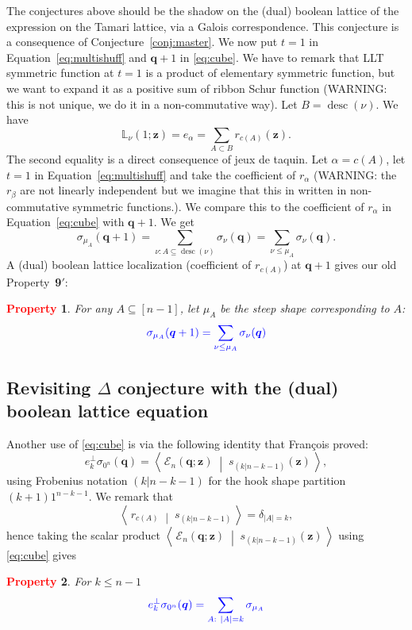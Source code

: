 \documentclass[12pt]{amsart}
\newcommand{\blue}[1]{\textcolor{blue}{#1}}
\newcommand{\red}[1]{\textcolor{red}{#1}}
\newcommand{\green}[1]{\textcolor{green!75!black}{#1}}
\theoremstyle{plain}
\newtheorem{property}{\red{Property}}
\theoremstyle{definition}
\theoremstyle{remark}
\newcommand{\Qvar}{{\bm q}}
\newcommand{\Zvar}{{\bm z}}
\newcommand{\desc}{\mathop{\mathrm{desc}}}
\newcommand{\dotprod}[2]{\left\langle \, #1 \; \middle| \; #2 \, \right\rangle} %
\begin{document}
The conjectures above should be the shadow on the (dual) boolean lattice of the expression on the Tamari lattice, via a Galois correspondence.
This conjecture is a consequence of Conjecture~\ref{conj:master}. We  now put $t=1$ in Equation~\eqref{eq:multishuff}  and $\Qvar+1$ in \eqref{eq:cube}.
We have to remark that LLT symmetric function at $t=1$ is a product of elementary symmetric function, but we want to expand it as a positive sum of ribbon 
Schur function (\green{WARNING: this is not unique, we do it in a non-commutative way}). Let $B = \desc(\nu)$. We have
\[
{\mathbb L}_\nu(1;\Zvar)= e_{\alpha}=\sum_{A\subset B} r_{c(A)}(\Zvar).
\]
The second equality is a direct consequence of jeux de taquin. Let $\alpha=c(A)$, let $t=1$ in Equation~\eqref{eq:multishuff} and take the coefficient of $r_\alpha$
(\green{WARNING: the $r_\beta$ are not linearly independent but we imagine that this in written in non-commutative symmetric functions.}). We compare this to the coefficient of $r_\alpha$ in Equation~\eqref{eq:cube} with $\Qvar+1$. We get
\[
\sigma_{\mu_A}(\Qvar+1) = \sum_{\nu: A\subseteq \desc(\nu)} \sigma_\nu(\Qvar)= \sum_{\nu\le \mu_A} \sigma_\nu(\Qvar).
\]
A (dual) boolean lattice localization (coefficient of $r_{c(A)}$) at $\Qvar+1$   gives our old Property~{\bf 9$'$}:

\begin{property}\label{P:steepQ1}
For any $A\subseteq [n-1]$, let $\mu_A$ be the steep shape corresponding to $A$:
\[
\blue{\sigma_{\mu_A}(\Qvar+1) = \sum_{\nu\le \mu_A} \sigma_\nu(\Qvar)
}
\]
\end{property}

\subsection{Revisiting $\Delta$ conjecture with the (dual) boolean lattice equation}

Another use of \eqref{eq:cube} is via the following identity that Fran\c{c}ois proved:
\[
e_k^\perp \sigma_{0^n}(\Qvar) = \dotprod{{\mathcal E}_n(\Qvar;\Zvar)}{s_{(k | n-k-1)}(\Zvar)},
\]
using Frobenius notation $(k | n-k-1)$ for the hook shape partition $(k+1)1^{n-k-1}$.
We remark that
\[
\dotprod{r_{c(A)}}{s_{(k | n-k-1)}} = \delta_{|A|=k},
\]
hence taking the scalar product $\dotprod{{\mathcal E}_n(\Qvar;\Zvar)}{s_{(k | n-k-1)}(\Zvar)}$ using \eqref{eq:cube} gives

\begin{property}\label{P:DeltaAlt}
For $k\le n-1$
\[
\blue{e_k^\perp \sigma_{0^n}(\Qvar)  = \sum_{A:\  |A|=k} \sigma_{\mu_A}
}
\]
\end{property}
\end{document}
